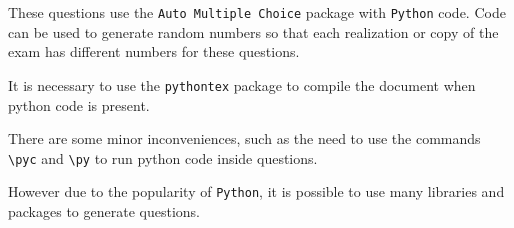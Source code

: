 \documentclass[a4paper]{article}
\begin{document}
These questions use the \texttt{Auto Multiple Choice} package with \texttt{Python} code.
Code can be used to generate random numbers so that each realization or copy of the exam has different numbers for these questions.

It is necessary to use the \texttt{pythontex} package to compile the document when python code is present.

There are some minor inconveniences, such as the need to use the commands \texttt{\textbackslash pyc{}} and \texttt{\textbackslash py{}} to run python code inside questions.

However due to the popularity of \texttt{Python}, it is possible to use many libraries and packages to generate questions.

\end{document}
